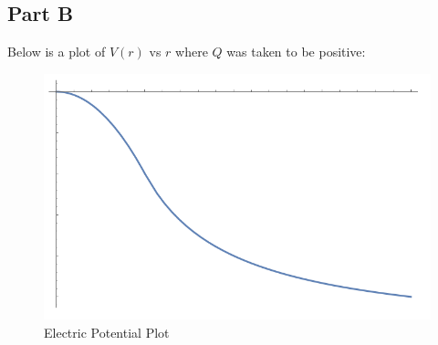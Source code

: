 \documentclass{article}
\begin{document}
\subsection*{Part B}

Below is a plot of $V(r)$ vs $r$ where $Q$ was taken to be positive:

\begin{figure}[H]
  \centering
  \includegraphics[scale=0.40]{"ElectricPotentialPlot"}
  \caption{Electric Potential Plot}
\end{figure}
\end{document}
